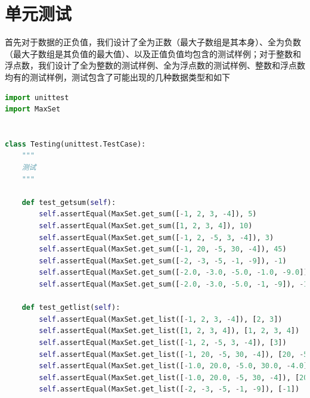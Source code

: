 \documentclass{article}
\begin{document}
\section{单元测试}
首先对于数据的正负值，我们设计了全为正数（最大子数组是其本身）、全为负数（最大子数组是其负值的最大值）、以及正值负值均包含的测试样例；对于整数和浮点数，我们设计了全为整数的测试样例、全为浮点数的测试样例、整数和浮点数均有的测试样例，测试包含了可能出现的几种数据类型和如下
\begin{lstlisting}[language = python]
import unittest
import MaxSet


class Testing(unittest.TestCase):
    """
    测试
    """

    def test_getsum(self):
        self.assertEqual(MaxSet.get_sum([-1, 2, 3, -4]), 5)
        self.assertEqual(MaxSet.get_sum([1, 2, 3, 4]), 10)
        self.assertEqual(MaxSet.get_sum([-1, 2, -5, 3, -4]), 3)
        self.assertEqual(MaxSet.get_sum([-1, 20, -5, 30, -4]), 45)
        self.assertEqual(MaxSet.get_sum([-2, -3, -5, -1, -9]), -1)
        self.assertEqual(MaxSet.get_sum([-2.0, -3.0, -5.0, -1.0, -9.0]), -1)
        self.assertEqual(MaxSet.get_sum([-2.0, -3.0, -5.0, -1, -9]), -1)

    def test_getlist(self):
        self.assertEqual(MaxSet.get_list([-1, 2, 3, -4]), [2, 3])
        self.assertEqual(MaxSet.get_list([1, 2, 3, 4]), [1, 2, 3, 4])
        self.assertEqual(MaxSet.get_list([-1, 2, -5, 3, -4]), [3])
        self.assertEqual(MaxSet.get_list([-1, 20, -5, 30, -4]), [20, -5, 30])
        self.assertEqual(MaxSet.get_list([-1.0, 20.0, -5.0, 30.0, -4.0]), [20.0, -5.0, 30.0])
        self.assertEqual(MaxSet.get_list([-1.0, 20.0, -5, 30, -4]), [20.0, -5, 30])
        self.assertEqual(MaxSet.get_list([-2, -3, -5, -1, -9]), [-1])


\end{lstlisting}
\end{document}
